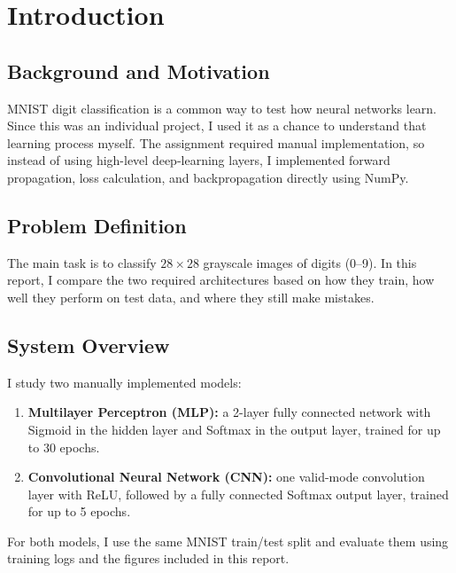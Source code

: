 \section{Introduction}

\subsection{Background and Motivation}
MNIST digit classification is a common way to test how neural networks learn. Since this was an individual project, I used it as a chance to understand that learning process myself. The assignment required manual implementation, so instead of using high-level deep-learning layers, I implemented forward propagation, loss calculation, and backpropagation directly using NumPy.

\subsection{Problem Definition}
The main task is to classify $28\times 28$ grayscale images of digits (0--9). In this report, I compare the two required architectures based on how they train, how well they perform on test data, and where they still make mistakes.

\subsection{System Overview}
I study two manually implemented models:
\begin{enumerate}
    \item \textbf{Multilayer Perceptron (MLP):} a 2-layer fully connected network with Sigmoid in the hidden layer and Softmax in the output layer, trained for up to 30 epochs.
    \item \textbf{Convolutional Neural Network (CNN):} one valid-mode convolution layer with ReLU, followed by a fully connected Softmax output layer, trained for up to 5 epochs.
\end{enumerate}
For both models, I use the same MNIST train/test split and evaluate them using training logs and the figures included in this report.